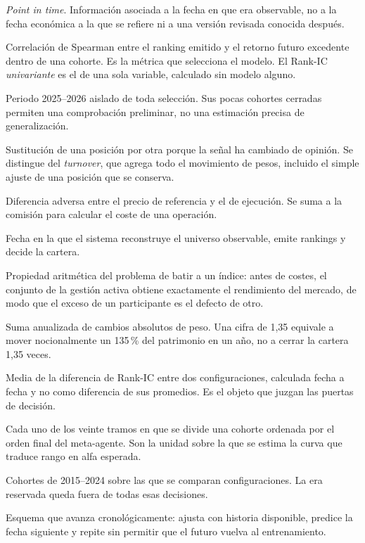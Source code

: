 \begin{description}[leftmargin=3.2cm,style=nextline,itemsep=0.45em]
  \item[PIT] \textit{Point in time}. Información asociada a la fecha en que era observable, no a
  la fecha económica a la que se refiere ni a una versión revisada conocida después.
  \item[Rank-IC] Correlación de Spearman entre el ranking emitido y el retorno futuro excedente
  dentro de una cohorte. Es la métrica que selecciona el modelo. El Rank-IC \emph{univariante} es el
  de una sola variable, calculado sin modelo alguno.
  \item[Reserva] Periodo 2025--2026 aislado de toda selección. Sus pocas cohortes cerradas permiten
  una comprobación preliminar, no una estimación precisa de generalización.
  \item[Rotación] Sustitución de una posición por otra porque la señal ha cambiado de opinión. Se
  distingue del \textit{turnover}, que agrega todo el movimiento de pesos, incluido el simple ajuste
  de una posición que se conserva.
  \item[Slippage] Diferencia adversa entre el precio de referencia y el de ejecución. Se suma a la
  comisión para calcular el coste de una operación.
  \item[Snapshot] Fecha en la que el sistema reconstruye el universo observable, emite rankings y
  decide la cartera.
  \item[Suma cero] Propiedad aritmética del problema de batir a un índice: antes de costes, el
  conjunto de la gestión activa obtiene exactamente el rendimiento del mercado, de modo que el
  exceso de un participante es el defecto de otro.
  \item[Turnover] Suma anualizada de cambios absolutos de peso. Una cifra de 1,35 equivale a mover
  nocionalmente un 135\,\% del patrimonio en un año, no a cerrar la cartera 1,35 veces.
  \item[Ventaja pareada] Media de la diferencia de Rank-IC entre dos configuraciones, calculada
  fecha a fecha y no como diferencia de sus promedios. Es el objeto que juzgan las puertas de
  decisión.
  \item[Ventila] Cada uno de los veinte tramos en que se divide una cohorte ordenada por el orden
  final del meta-agente. Son la unidad sobre la que se estima la curva que traduce rango en alfa
  esperada.
  \item[Ventana de selección] Cohortes de 2015--2024 sobre las que se comparan configuraciones. La
  era reservada queda fuera de todas esas decisiones.
  \item[Walk-forward] Esquema que avanza cronológicamente: ajusta con historia disponible, predice
  la fecha siguiente y repite sin permitir que el futuro vuelva al entrenamiento.
\end{description}
